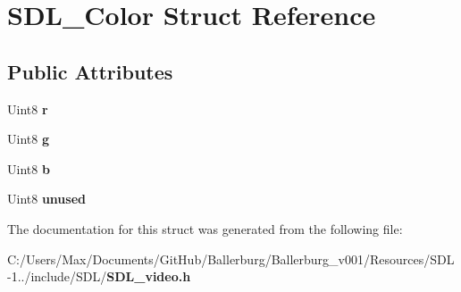 \section{S\+D\+L\+\_\+\+Color Struct Reference}
\label{struct_s_d_l___color}
\subsection*{Public Attributes}
\begin{DoxyCompactItemize}
\item 
Uint8 {\bfseries r}\label{struct_s_d_l___color_a0bb975b6829524133fdd3c6060cfa63d}

\item 
Uint8 {\bfseries g}\label{struct_s_d_l___color_ae29d881bf740cfa7078b36e07f85d298}

\item 
Uint8 {\bfseries b}\label{struct_s_d_l___color_a3b79a27e0414049559aa5bcf241dedd3}

\item 
Uint8 {\bfseries unused}\label{struct_s_d_l___color_a72c141f474a236dd0e881a4167783e2e}

\end{DoxyCompactItemize}


The documentation for this struct was generated from the following file\+:\begin{DoxyCompactItemize}
\item 
C\+:/\+Users/\+Max/\+Documents/\+Git\+Hub/\+Ballerburg/\+Ballerburg\+\_\+v001/\+Resources/\+S\+D\+L-\/1../include/\+S\+D\+L/{\bf S\+D\+L\+\_\+video.\+h}\end{DoxyCompactItemize}
